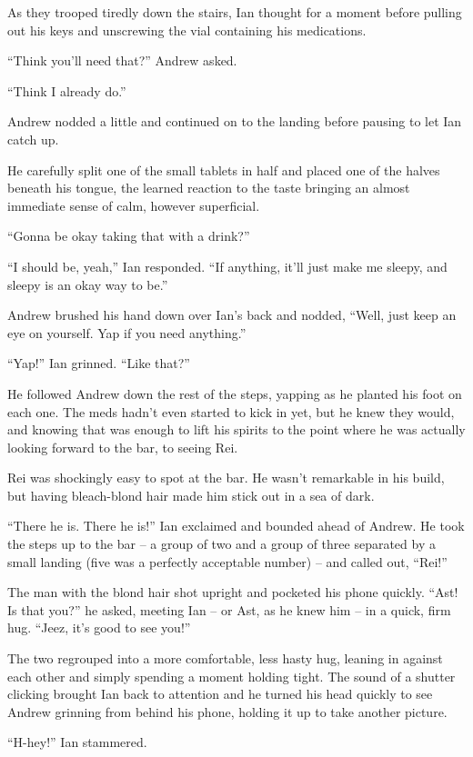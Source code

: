 As they trooped tiredly down the stairs, Ian thought for a moment before pulling out his keys and unscrewing the vial containing his medications.

``Think you'll need that?'' Andrew asked.

``Think I already do.''

Andrew nodded a little and continued on to the landing before pausing to let Ian catch up.

He carefully split one of the small tablets in half and placed one of the halves beneath his tongue, the learned reaction to the taste bringing an almost immediate sense of calm, however superficial.

``Gonna be okay taking that with a drink?''

``I should be, yeah,'' Ian responded. ``If anything, it'll just make me sleepy, and sleepy is an okay way to be.''

Andrew brushed his hand down over Ian's back and nodded, ``Well, just keep an eye on yourself. Yap if you need anything.''

``Yap!'' Ian grinned.  ``Like that?''

He followed Andrew down the rest of the steps, yapping as he planted his foot on each one. The meds hadn't even started to kick in yet, but he knew they would, and knowing that was enough to lift his spirits to the point where he was actually looking forward to the bar, to seeing Rei.

Rei was shockingly easy to spot at the bar. He wasn't remarkable in his build, but having bleach-blond hair made him stick out in a sea of dark.

``There he is. There he is!'' Ian exclaimed and bounded ahead of Andrew. He took the steps up to the bar -- a group of two and a group of three separated by a small landing (five was a perfectly acceptable number) -- and called out, ``Rei!''

The man with the blond hair shot upright and pocketed his phone quickly. ``Ast! Is that you?'' he asked, meeting Ian -- or Ast, as he knew him -- in a quick, firm hug. ``Jeez, it's good to see you!''

The two regrouped into a more comfortable, less hasty hug, leaning in against each other and simply spending a moment holding tight. The sound of a shutter clicking brought Ian back to attention and he turned his head quickly to see Andrew grinning from behind his phone, holding it up to take another picture.

``H-hey!'' Ian stammered.

